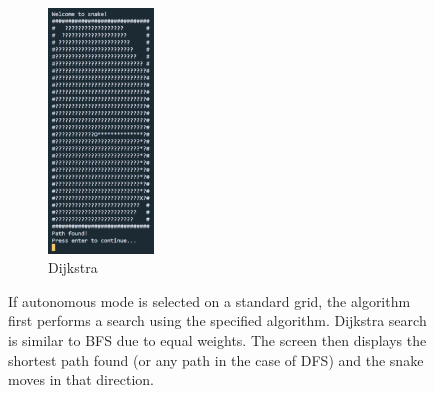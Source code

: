 \documentclass[11pt]{article}
\begin{document}
\begin{figure}[H]
\begin{subfigure}{0.24\textwidth}
    \label{fig:subim6}
\end{subfigure}
\begin{subfigure}{0.24\textwidth}
    \centering
    \includegraphics[height=6.5cm]{Dijkstra_Path_Found}
    \caption{Dijkstra}
    \label{fig:subim7}
\end{subfigure}

\caption{If autonomous mode is selected on a standard grid, the algorithm first performs a search using the specified algorithm. Dijkstra search is similar to BFS due to equal weights. 
The screen then displays the shortest path found (or any path in the case of DFS) and the snake moves in that direction.}
\label{fig:image2}
\end{figure}
\end{document}
